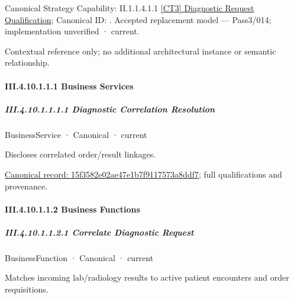 {\small Canonical Strategy Capability: II.1.1.4.1.1 \hyperref[element:aa18023812014178b3c49df16bf39e5c]{[CT3] Diagnostic Request Qualification}; Canonical ID: \texttt{}. Accepted replacement model — Pass3/014; implementation unverified · current.}\par
Contextual reference only; no additional architectural instance or semantic relationship.\par
\paragraph*{III.4.10.1.1.1 Business Services}
\label{navigation:III.4.10.1.1.1}

\subparagraph*{III.4.10.1.1.1.1 Diagnostic Correlation Resolution}
\label{navigation:III.4.10.1.1.1.1}

\label{element:15f3582e02ae47e1b7f9117573a8ddf7}
{\small BusinessService · Canonical · current}\par

Discloses correlated order/result linkages.


{\footnotesize \href{../../../../../../../../continuum/business/business-service/15f3582e02ae47e1b7f9117573a8ddf7.md}{Canonical record: 15f3582e02ae47e1b7f9117573a8ddf7}; full qualifications and provenance.}\par
\paragraph*{III.4.10.1.1.2 Business Functions}
\label{navigation:III.4.10.1.1.2}

\subparagraph*{III.4.10.1.1.2.1 Correlate Diagnostic Request}
\label{navigation:III.4.10.1.1.2.1}

\label{element:6797819b02e0405c8169fa57544d9606}
{\small BusinessFunction · Canonical · current}\par

Matches incoming lab/radiology results to active patient encounters and order requisitions.


